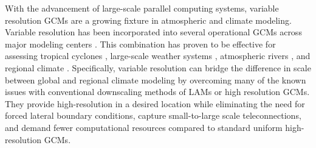 With the advancement of large-scale parallel computing systems,
variable resolution GCMs are
a growing fixture in atmospheric and climate modeling. Variable resolution has been 
incorporated into several operational GCMs across major modeling centers 
\citep{skamarock2012multiscale,Harris:2013nt,zarzycki2014aquaplanet}.
This combination has proven to be effective for assessing
tropical cyclones \citep{zarzycki2014multidecadal, zarzycki2015tropical, huang2017influences}, 
large-scale weather systems \citep{rauscher2014impact}, atmospheric rivers \citep{hagos2015resolution},
 and regional climate \citep{medvigy2013simulated, huang:16, gettelman2017regional, rhoades2018projecting}.
Specifically, variable resolution can bridge the difference in 
scale between global and regional climate modeling by overcoming
many of the known issues with conventional downscaling methods of LAMs or high resolution GCMs.
They provide high-resolution in a desired location while eliminating the need for forced lateral boundary conditions, 
capture small-to-large scale teleconnections, and demand fewer computational
resources compared to standard uniform high-resolution GCMs.


